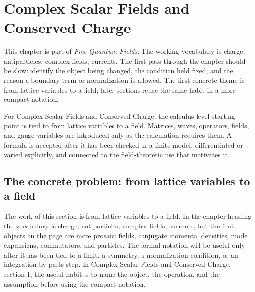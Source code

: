 \chapter{Complex Scalar Fields and Conserved Charge}


This chapter is part of \emph{Free Quantum Fields}.  The working vocabulary is charge, antiparticles, complex fields, currents.  The first pass through the chapter should be slow: identify the object being changed, the condition held fixed, and the reason a boundary term or normalization is allowed.  The first concrete theme is from lattice variables to a field; later sections reuse the same habit in a more compact notation.

For Complex Scalar Fields and Conserved Charge, the calculus-level starting point is tied to from lattice variables to a field.  Matrices, waves, operators, fields, and gauge variables are introduced only as the calculation requires them.  A formula is accepted after it has been checked in a finite model, differentiated or varied explicitly, and connected to the field-theoretic use that motivates it.

\section{The concrete problem: from lattice variables to a field}













The work of this section is from lattice variables to a field.  In the chapter heading the vocabulary is charge, antiparticles, complex fields, currents, but the first objects on the page are more prosaic: fields, conjugate momenta, densities, mode expansions, commutators, and particles.  The formal notation will be useful only after it has been tied to a limit, a symmetry, a normalization condition, or an integration-by-parts step.  In Complex Scalar Fields and Conserved Charge, section 1, the useful habit is to name the object, the operation, and the assumption before using the compact notation.

